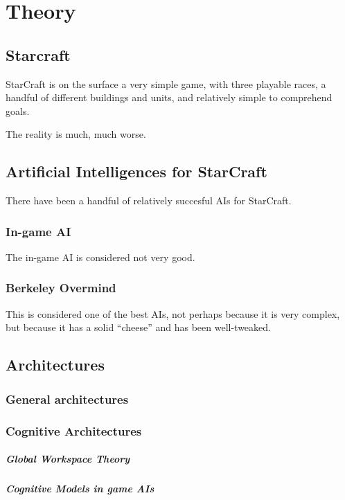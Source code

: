 \chapter{Theory}
\section{Starcraft}
StarCraft is on the surface a very simple game, with three playable races, a
handful of different buildings and units, and relatively simple to comprehend
goals.

The reality is much, much worse.
\cite{blizzardstarcraft}

\section{Artificial Intelligences for StarCraft}
There have been a handful of relatively succesful AIs for StarCraft.

\subsection{In-game AI}
The in-game AI is considered not very good.

\subsection{Berkeley Overmind}
This is considered one of the best AIs, not perhaps because it is very complex,
but because it has a solid ``cheese'' and has been well-tweaked.


\section{Architectures}
\subsection{General architectures}
\subsection{Cognitive Architectures}
\paragraph{Global Workspace Theory}
\paragraph{Cognitive Models in game AIs}
